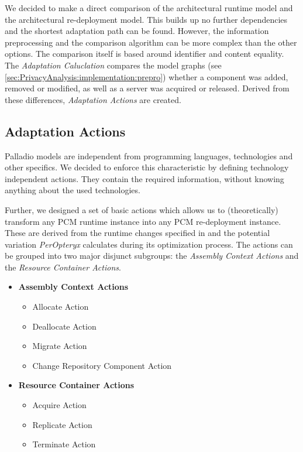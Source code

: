 We decided to make a direct comparison of the architectural runtime model and the architectural re-deployment model. This builds up no further dependencies and the shortest adaptation path can be found. However, the information preprocessing and the comparison algorithm can be more complex than the other options. The comparison itself is based around identifier and content equality. The \textit{Adaptation Caluclation} compares the model graphs (see \autoref{sec:PrivacyAnalysis:implementation:prepro}) whether a component was added, removed or modified, as well as a server was acquired or released. Derived from these differences, \textit{Adaptation Actions} are created.


\subsection{Adaptation Actions}
Palladio models are independent from programming languages, technologies and other specifics. We decided to enforce this characteristic by defining technology independent actions. They contain the required information, without knowing anything about the used technologies.

Further, we designed a set of basic actions which allows us to (theoretically) transform any PCM runtime instance into any PCM re-deployment instance. These are derived from the runtime changes specified in \cite{Heinrich.2016b} and the potential variation \textit{PerOpteryx} calculates during its optimization process. The actions can be grouped into two major disjunct subgroups: the \textit{Assembly Context Actions} and the \textit{Resource Container Actions}.

\begin{itemize}
	\label{enum:SysAdap:plan:actions}
	\setlength\itemsep{0em}
	\item \textbf{Assembly Context Actions}
	\begin{itemize}
		\setlength\itemsep{0em}
		\item Allocate Action
		\item Deallocate Action
		\item Migrate Action
		\item Change Repository Component Action
	\end{itemize}
	\item \textbf{Resource Container Actions}
	\begin{itemize}
		\setlength\itemsep{0em}
		\item Acquire Action
		\item Replicate Action
		\item Terminate Action
	\end{itemize}
\end{itemize}

